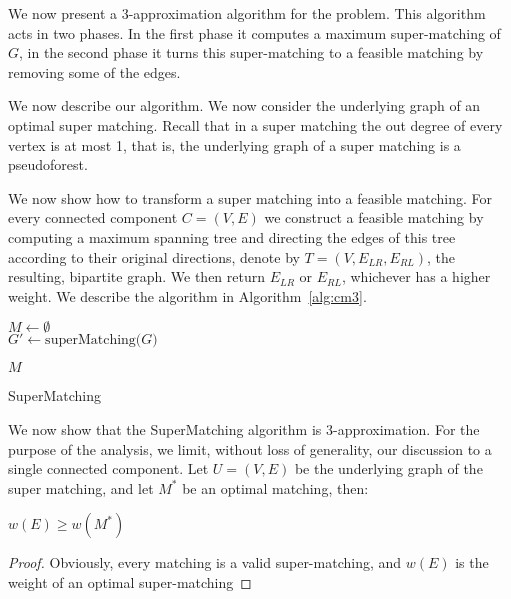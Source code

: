 \label{sub:cm}
We now present a 3-app\-roximation algorithm for the \textsc{\CARPOOL{}} problem.
This algorithm acts in two phases.
In the first phase it computes a maximum super-matching of $G$, 
in the second phase it turns this super-matching to a feasible matching
by removing some of the edges.

We now describe our algorithm. 
We now consider the underlying graph of an optimal super matching.
Recall that in a super matching the out degree of every vertex is at most 1,
that is, the underlying graph of a super matching is a pseudoforest.

We now show how to transform a super matching into a feasible matching.
For every connected component $C = (V, E)$ we construct a feasible matching by
computing a maximum spanning tree and directing the edges of this tree according
to their original directions, denote by $T = (V, E_{LR}, E_{RL})$, the resulting, 
bipartite graph.
We then return $E_{LR}$ or $E_{RL}$,
whichever has a higher weight. 
We describe the algorithm in Algorithm~\ref{alg:cm3}.

\begin{algorithm}
\label{alg:cm3}

$M \leftarrow \emptyset$								\\
$G' \leftarrow \text{superMatching($G$)}$				\\


\Return $M$
\caption{SuperMatching}
\end{algorithm}

We now show that the SuperMatching algorithm is 3-approximation.
For the purpose of the analysis, we limit, without loss of generality, 
our discussion to a single connected component.
Let $U = (V, E)$ be the underlying graph of the super matching, 
and let $M^*$ be an optimal matching, then:
\begin{lemma}
\label{lm:super-geq-m^*}
$w(E) \geq w(M^*)$
\end{lemma}

\begin{proof}
Obviously, every matching is a valid super-matching, 
and $w(E)$ is the weight of an optimal super-matching 
\end{proof}

